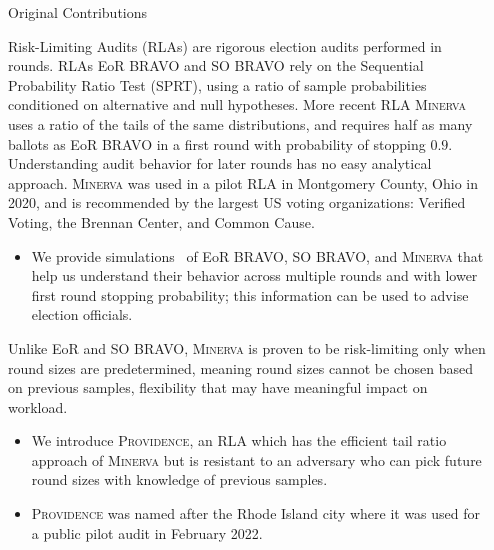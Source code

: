 \documentclass[final]{beamer}
\newcommand{\Minerva}{\textsc{Minerva}\xspace}
\newcommand{\Prov}{\textsc{Providence}\xspace}
\newcommand{\BRAVO}{\textsc{BRAVO}\xspace}
\newlength{\sepwidth}
\newlength{\colwidth}
\newcommand{\separatorcolumn}{\begin{column}{\sepwidth}\end{column}}
\begin{document}
\begin{frame}[t]
\begin{columns}[t]
\separatorcolumn

\begin{column}{\colwidth}

\begin{block}{Original Contributions}

Risk-Limiting Audits (RLAs) are rigorous election audits performed in rounds. 
RLAs EoR \BRAVO and SO \BRAVO \cite{bravo} rely on the Sequential Probability Ratio Test (SPRT), using
a ratio of sample probabilities conditioned on alternative and null hypotheses.
More recent RLA \Minerva \cite{usenix_minerva} uses a ratio of the tails of the same distributions, and requires half as many
ballots as EoR \BRAVO in a first round with probability of stopping $0.9$.
Understanding audit behavior for later rounds has no easy analytical approach.
\Minerva was used in a pilot RLA in Montgomery County, Ohio in 2020,
and is recommended by the largest US voting organizations: Verified Voting, the Brennan Center, and Common Cause.

\begin{itemize}
\item
We provide simulations~\cite{simulations} of EoR \BRAVO, SO \BRAVO, and \Minerva that help us understand their behavior across multiple rounds and with lower
first round stopping probability; this information can be used to advise election officials.
\end{itemize}

Unlike EoR and SO \BRAVO, \Minerva is proven to be risk-limiting only when round sizes are predetermined, 
meaning round sizes cannot be chosen based on previous samples, flexibility that may have meaningful impact on workload.

\begin{itemize}
\item We introduce \Prov, an RLA which has the efficient tail ratio approach of \Minerva but is resistant to an adversary who can pick
future round sizes with knowledge of previous samples. 
\item \Prov was named after the Rhode Island city where it was used for a public
pilot audit in February 2022.
\end{itemize}
\end{block}


\end{column}
\end{columns}
\end{frame}
\end{document}
